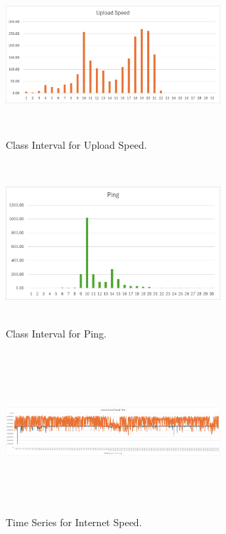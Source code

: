 \documentclass[conference]{IEEEtran}
\begin{document}
\begin{figure}[!htbp]
    \centerline{\includegraphics[width=8cm,height=6cm,keepaspectratio]{Figures/Picture4.png}}
    \caption{Class Interval for Upload Speed.}
    \label{fig5}
\end{figure}

\begin{figure}[!htbp]
    \centerline{\includegraphics[width=8cm,height=6cm,keepaspectratio]{Figures/Picture5.png}}
    \caption{Class Interval for Ping.}
    \label{fig6}
\end{figure}

\begin{figure}[!htbp]
    \centerline{\includegraphics[width=8cm,height=6cm,keepaspectratio]{Figures/Picture7.png}}
    \caption{Time Series for Internet Speed.}
    \label{fig6}
\end{figure}
\end{document}
